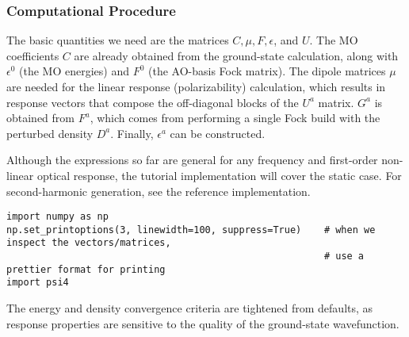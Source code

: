 \subsubsection{Computational Procedure}

The basic quantities we need are the matrices \(C, \mu, F, \epsilon\), and \(U\). The MO coefficients \(C\) are already obtained from the ground-state calculation, along with \(\epsilon^{0}\) (the MO energies) and \(F^{0}\) (the AO-basis Fock matrix). The dipole matrices \(\mu\) are needed for the linear response (polarizability) calculation, which results in response vectors that compose the off-diagonal blocks of the \(U^{a}\) matrix. \(G^{a}\) is obtained from \(F^{a}\), which comes from performing a single Fock build with the perturbed density \(D^{a}\).  Finally, \(\epsilon^{a}\) can be constructed.

Although the expressions so far are general for any frequency and first-order non-linear optical response, the tutorial implementation will cover the static case. For second-harmonic generation, see the reference implementation.

\begin{verbatim}
import numpy as np
np.set_printoptions(3, linewidth=100, suppress=True)    # when we inspect the vectors/matrices,
                                                        # use a prettier format for printing
import psi4
\end{verbatim}
The energy and density convergence criteria are tightened from defaults, as response properties are sensitive to the quality of the ground-state wavefunction.

